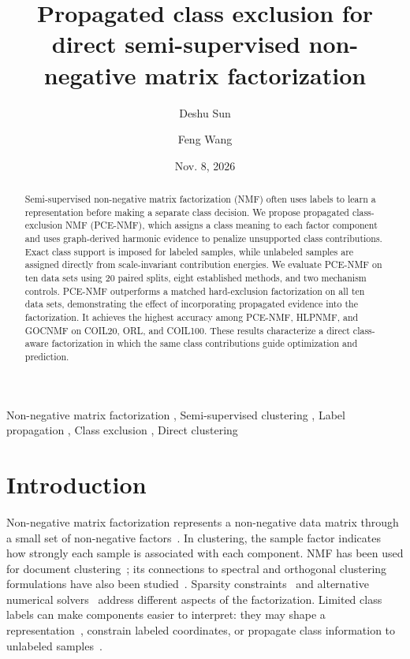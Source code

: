 \documentclass[preprint,12pt]{elsarticle}
\date{Nov. 8, 2026}
\theoremstyle{remark}
\begin{document}
\begin{frontmatter}

\title{Propagated class exclusion for direct semi-supervised non-negative matrix factorization}

\author{Deshu Sun}
\author{Feng Wang}
\address{College of Data Science and Information Engineering, Guizhou Minzu University, Guiyang, Guizhou 550025, P.R. China}

\begin{abstract}
Semi-supervised non-negative matrix factorization (NMF) often uses
labels to learn a representation before making a separate class
decision. We propose propagated class-exclusion NMF (PCE-NMF), which
assigns a class meaning to each factor component and uses graph-derived
harmonic evidence to penalize unsupported class contributions. Exact
class support is imposed for labeled samples, while unlabeled samples
are assigned directly from scale-invariant contribution energies. We
evaluate PCE-NMF on ten data sets using 20 paired splits, eight
established methods, and two mechanism controls. PCE-NMF outperforms a
matched hard-exclusion factorization on all ten data sets, demonstrating
the effect of incorporating propagated evidence into the
factorization. It achieves the highest accuracy among PCE-NMF, HLPNMF,
and GOCNMF on COIL20, ORL, and COIL100. These results characterize a
direct class-aware factorization in which the same class contributions
guide optimization and prediction.
\end{abstract}

\begin{keyword}
Non-negative matrix factorization \sep
Semi-supervised clustering \sep
Label propagation \sep
Class exclusion \sep
Direct clustering
\end{keyword}

\end{frontmatter}

\section{Introduction}
\label{sec:introduction}

Non-negative matrix factorization represents a non-negative data matrix
through a small set of non-negative factors~\cite{lee1999parts,lee2000algorithms}. In clustering, the sample
factor indicates how strongly each sample is associated with each
component. NMF has been used for document clustering~\cite{xu2003document};
its connections to spectral and orthogonal clustering formulations
have also been studied~\cite{ding2005spectral,ding2006orthogonal}.
Sparsity constraints~\cite{hoyer2004sparse} and alternative numerical
solvers~\cite{lin2007projected,kim2011fast} address different aspects
of the factorization. Limited class labels can make components easier
to interpret: they may shape a representation~\cite{liu2012cnmf},
constrain labeled coordinates, or propagate class information to
unlabeled samples~\cite{zhu2003harmonic}.
\end{document}
